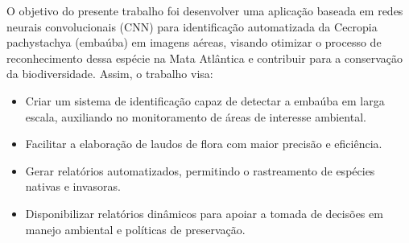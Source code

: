 O objetivo do presente trabalho foi desenvolver uma aplicação baseada em redes neurais convolucionais (CNN) para identificação automatizada da Cecropia pachystachya (embaúba) em imagens aéreas, visando otimizar o processo de reconhecimento dessa espécie na Mata Atlântica e contribuir para a conservação da biodiversidade. Assim, o trabalho visa:

\begin{itemize}
\item Criar um sistema de identificação capaz de detectar a embaúba em larga escala, auxiliando no monitoramento de áreas de interesse ambiental.
\item Facilitar a elaboração de laudos de flora com maior precisão e eficiência.
\item Gerar relatórios automatizados, permitindo o rastreamento de espécies nativas e invasoras.
\item Disponibilizar relatórios dinâmicos para apoiar a tomada de decisões em manejo ambiental e políticas de preservação.
\end{itemize}





